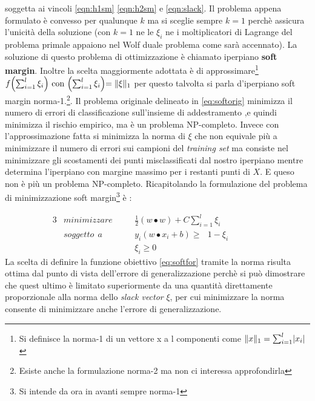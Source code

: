 soggetta ai vincoli \eqref{eqn:h1sm} \eqref{eqn:h2sm} e \eqref{eqn:slack}. Il problema appena formulato è convesso  per qualunque $k$ ma si sceglie sempre $k=1$ perchè assicura l'unicità della soluzione (con $k=1$ ne le $\xi_i$ ne i moltiplicatori di Lagrange del problema primale appaiono nel Wolf duale problema come sarà accennato). La soluzione di questo problema di ottimizzazione è chiamato iperpiano \textbf{soft margin}. Inoltre la scelta maggiormente adottata è di approssimare\footnote{Si definisce la norma-1 di un vettore x a l componenti come $\lVert x\rVert_1 = \sum_{i=1}^{l}\lvert x_i\rvert$} $f\Bigl(\sum_{i=1}^{l}\xi_i\Bigl) \text{ con } \Bigl(\sum_{i=1}^{l}\xi_i\Bigl) = \lVert\xi\rVert_1$ per questo talvolta si parla d'iperpiano soft margin norma-1.\footnote{Esiste anche la formulazione norma-2 ma non ci interessa approfondirla}. Il problema originale delineato in \eqref{eq:softorig}  minimizza il numero di errori di classificazione sull'insieme di addestramento ,e quindi minimizza il rischio empirico, ma è un problema NP-completo. Invece con l'approssimazione fatta si minimizza la norma di $\xi$  che non equivale più a minimizzare il numero di errori sui campioni del \textit{training set} ma consiste nel minimizzare gli scostamenti dei punti misclassificati dal nostro iperpiano  mentre determina l'iperpiano con margine massimo  per i restanti punti di $X$. E queso non è più un problema NP-completo. Ricapitolando la formulazione del problema di minimizzazione soft margin\footnote{Si intende da ora in avanti sempre norma-1} è :


\begin{alignat}{3}
\label{eq:softfor}
&minimizzare \quad&&\frac{1}{2}(w \bullet w) + C\sum_{i=1}^{l}\xi_i \\
\label{eq:softvinc}
&soggetto \:\:a &&y_i(w \bullet x_i + b) \geq \:\:\:1-\xi_i \qquad \qquad \\
&\:&&\xi_i \geq 0 \label{eq:softvin2}
\end{alignat}
La scelta di definire la funzione obiettivo \eqref{eq:softfor} tramite la norma risulta ottima dal punto di vista dell'errore di generalizzazione perchè si può dimostrare che quest ultimo è limitato superiormente da una quantità direttamente proporzionale alla norma dello \textit{slack vector} $\xi$, per cui minimizzare la norma consente di minimizzare anche l'errore di generalizzazione.

